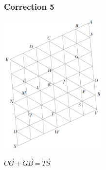 \documentclass[15pt, mathserif]{beamer}
\begin{document}
\begin{frame}
\vspace{-10mm}
	\frametitle{Correction 5}
\begin{center} 
 \includegraphics[width=0.4\textwidth]{GrilleIso2} \end{center}$\overrightarrow{CG}+\overrightarrow{GB}=\overrightarrow{TS}$\end{frame}
\end{document}

